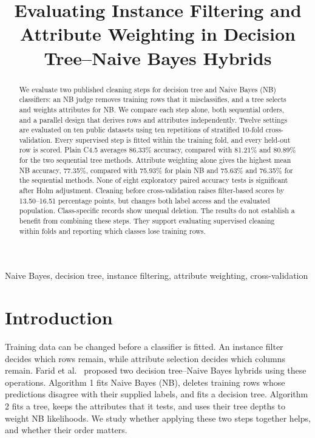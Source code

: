 \documentclass[conference,a4paper]{IEEEtran}
\begin{document}
\title{Evaluating Instance Filtering and Attribute Weighting in Decision Tree--Naive Bayes Hybrids}
\author{}
\maketitle

\begin{abstract}
We evaluate two published cleaning steps for decision tree and Naive Bayes (NB) classifiers: an NB judge removes training rows that it misclassifies, and a tree selects and weights attributes for NB. We compare each step alone, both sequential orders, and a parallel design that derives rows and attributes independently. Twelve settings are evaluated on ten public datasets using ten repetitions of stratified 10-fold cross-validation. Every supervised step is fitted within the training fold, and every held-out row is scored. Plain C4.5 averages 86.33\% accuracy, compared with 81.21\% and 80.89\% for the two sequential tree methods. Attribute weighting alone gives the highest mean NB accuracy, 77.35\%, compared with 75.93\% for plain NB and 75.63\% and 76.35\% for the sequential methods. None of eight exploratory paired accuracy tests is significant after Holm adjustment. Cleaning before cross-validation raises filter-based scores by 13.50--16.51 percentage points, but changes both label access and the evaluated population. Class-specific records show unequal deletion. The results do not establish a benefit from combining these steps. They support evaluating supervised cleaning within folds and reporting which classes lose training rows.
\end{abstract}
\begin{IEEEkeywords}
Naive Bayes, decision tree, instance filtering, attribute weighting, cross-validation
\end{IEEEkeywords}

\section{Introduction}
Training data can be changed before a classifier is fitted. An instance filter decides which rows remain, while attribute selection decides which columns remain. Farid et al.~\cite{farid2014hybrid} proposed two decision tree--Naive Bayes hybrids using these operations. Algorithm 1 fits Naive Bayes (NB), deletes training rows whose predictions disagree with their supplied labels, and fits a decision tree. Algorithm 2 fits a tree, keeps the attributes that it tests, and uses their tree depths to weight NB likelihoods. We study whether applying these two steps together helps, and whether their order matters.
\end{document}
